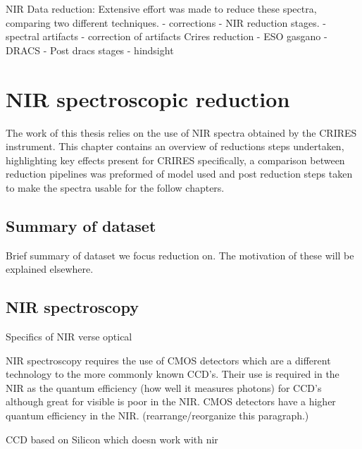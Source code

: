 %


NIR Data reduction:
Extensive effort was made to reduce these spectra, comparing two different techniques.
- corrections
- NIR reduction stages.
- spectral artifacts
- correction of artifacts
Crires reduction
- ESO gasgano
- DRACS
- Post dracs stages
- hindsight 



\chapter{NIR spectroscopic reduction} %
\label{cha:reduction} 

The work of this thesis relies on the use of NIR spectra obtained by the CRIRES instrument. This chapter contains an overview of reductions steps undertaken, highlighting key effects present for CRIRES specifically, a comparison between reduction pipelines was preformed of model used and post reduction steps taken to make the spectra usable for the follow chapters. 

\section{Summary of dataset}
Brief summary of dataset we focus reduction on. The motivation of these will be explained elsewhere.



 
\section{NIR spectroscopy}
Specifics of NIR verse optical


NIR spectroscopy requires the use of CMOS detectors which are a different technology to the more commonly known CCD's. Their use is required in the NIR as the quantum efficiency (how well it measures photons) for CCD's although great for visible is poor in the NIR. CMOS detectors have a higher quantum efficiency in the NIR. 
\change(rearrange/reorganize this paragraph.)

CCD based on Silicon which doesn work with nir


